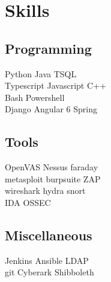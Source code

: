 \documentclass[letterpaper]{deedy-resume} %
\begin{document}
\begin{minipage}[t]{0.28\textwidth}




\section{Skills}

\subsection{Programming}

Python \textbullet{} Java \textbullet{} TSQL \\
Typescript \textbullet{} Javascript \textbullet{} C++ \\
Bash \textbullet{} Powershell \\
Django \textbullet{} Angular 6 \textbullet{} Spring

\sectionspace %

\subsection{Tools}
OpenVAS \textbullet{} Nessus \textbullet{} faraday \\
metasploit \textbullet{} burpsuite \textbullet{} ZAP \\
wireshark \textbullet{} hydra \textbullet{} snort \\
IDA \textbullet{} OSSEC

\sectionspace %

\subsection{Miscellaneous}
Jenkins \textbullet{} Ansible \textbullet{} LDAP \\
git \textbullet{} Cyberark  \textbullet{} Shibboleth



\end{minipage}
\end{document}
